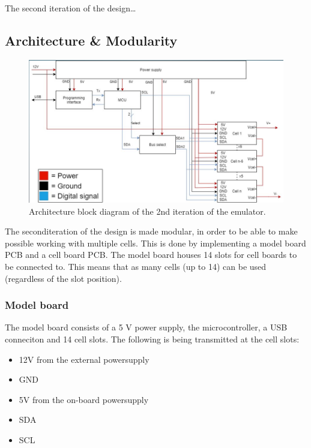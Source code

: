 \IEEEPARstart
{T}{he} second iteration of the design\dots

\subsection{Architecture \& Modularity}

\begin{figure}[h]
    \centering
    \includegraphics[scale=0.5]{architecture_2nd_iteration.png}
    \caption{Architecture block diagram of the 2nd iteration of the emulator.}
\end{figure}

The seconditeration of the design is made modular, in order to be able to make 
possible working with multiple cells. This is done by implementing a model board
PCB and a cell board PCB. The model board houses 14 slots for cell boards to be 
connected to. This means that as many cells (up to 14) can be used (regardless 
of the slot position).

    \subsubsection{Model board}
    The model board consists of a 5 V power supply, the microcontroller, a USB 
    conneciton and 14 cell slots. The following is being transmitted at the
    cell slots:

    \begin{itemize}
        \item 12V from the external powersupply
        \item GND
        \item 5V from the on-board powersupply
        \item SDA
        \item SCL
    \end{itemize}

